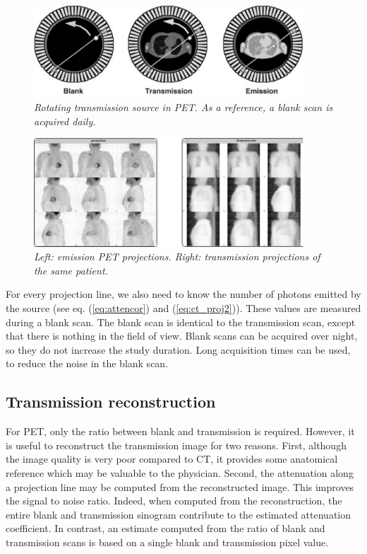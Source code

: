 \documentclass[11pt,oneside]{article}
\begin{document}
\begin{figure}[tb]
\centering
\includegraphics[width=0.9\textwidth]{figs/fig_pettrans.pdf}
\caption{\label{fig:pettrans} \emph{Rotating transmission source in PET. As a
reference, a blank scan is acquired daily.}}
\end{figure}

\begin{figure}[tb]
\centering
\includegraphics[width=0.9\textwidth]{figs/fig_transproj.pdf}
\caption{\label{fig:transproj} \emph{Left: emission PET projections. Right:
transmission projections of the same patient.}}
\end{figure}

For every projection line, we also need to know the number of photons
emitted by the source (see eq. (\ref{eq:attencor}) and
(\ref{eq:ct_proj2})). These values are measured during a blank
scan. The blank scan is identical to the transmission scan, except
that there is nothing in the field of view. Blank scans can be
acquired over night, so they do not increase the study duration. Long
acquisition times can be used, to reduce the noise in the blank scan.

\subsection{Transmission reconstruction}
For PET, only the ratio between blank and transmission is required. However,
it is useful to reconstruct the transmission image for two reasons. First,
although the image quality is very poor compared to CT, it provides some
anatomical reference which may be valuable to the physician. Second, the
attenuation along a projection line may be computed from the reconstructed
image. This improves the signal to noise ratio. Indeed, when computed from the
reconstruction, the entire blank and transmission sinogram contribute to the
estimated attenuation coefficient. In contrast, an estimate computed from the
ratio of blank and transmission scans is based on a single blank and
transmission pixel value.
\end{document}
